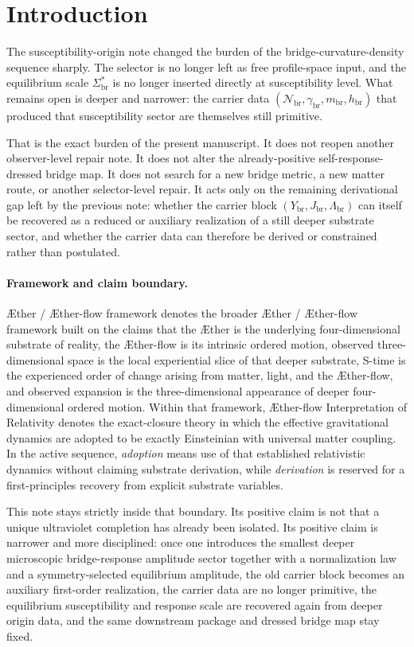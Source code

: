 \documentclass[11pt]{article}
\newcommand{\Aether}{\AE{}ther}
\newcommand{\Aflow}{\AE{}ther-flow}
\newcommand{\TheoryName}{\Aflow{} Interpretation of Relativity}
\newcommand{\TheoryProgram}{\Aether{} / \Aflow{} framework}
\newcommand{\RespSusEq}{\Sigma_{\mathrm{br}}^{\ast}}
\newcommand{\RespCarrier}{Y_{\mathrm{br}}}
\newcommand{\RespFlux}{J_{\mathrm{br}}}
\newcommand{\RespCompat}{\Lambda_{\mathrm{br}}}
\newcommand{\RespNorm}{\mathcal N_{\mathrm{br}}}
\newcommand{\RespFluxCoeff}{\gamma_{\mathrm{br}}}
\newcommand{\RespGap}{m_{\mathrm{br}}}
\newcommand{\RespBias}{h_{\mathrm{br}}}
\begin{document}
\section{Introduction}

The susceptibility-origin note changed the burden of the bridge-curvature-density sequence sharply. The selector is no longer left as free profile-space input, and the equilibrium scale \(\RespSusEq\) is no longer inserted directly at susceptibility level. What remains open is deeper and narrower: the carrier data \((\RespNorm,\RespFluxCoeff,\RespGap,\RespBias)\) that produced that susceptibility sector are themselves still primitive.

That is the exact burden of the present manuscript. It does not reopen another observer-level repair note. It does not alter the already-positive self-response-dressed bridge map. It does not search for a new bridge metric, a new matter route, or another selector-level repair. It acts only on the remaining derivational gap left by the previous note: whether the carrier block \((\RespCarrier,\RespFlux,\RespCompat)\) can itself be recovered as a reduced or auxiliary realization of a still deeper substrate sector, and whether the carrier data can therefore be derived or constrained rather than postulated.

\paragraph{Framework and claim boundary.}
\TheoryProgram{} denotes the broader \Aether{} / \Aflow{} framework built on the claims that the \Aether{} is the underlying four-dimensional substrate of reality, the \Aflow{} is its intrinsic ordered motion, observed three-dimensional space is the local experiential slice of that deeper substrate, S-time is the experienced order of change arising from matter, light, and the \Aflow{}, and observed expansion is the three-dimensional appearance of deeper four-dimensional ordered motion. Within that framework, \TheoryName{} denotes the exact-closure theory in which the effective gravitational dynamics are adopted to be exactly Einsteinian with universal matter coupling. In the active sequence, \emph{adoption} means use of that established relativistic dynamics without claiming substrate derivation, while \emph{derivation} is reserved for a first-principles recovery from explicit substrate variables.

This note stays strictly inside that boundary. Its positive claim is not that a unique ultraviolet completion has already been isolated. Its positive claim is narrower and more disciplined: once one introduces the smallest deeper microscopic bridge-response amplitude sector together with a normalization law and a symmetry-selected equilibrium amplitude, the old carrier block becomes an auxiliary first-order realization, the carrier data are no longer primitive, the equilibrium susceptibility and response scale are recovered again from deeper origin data, and the same downstream package and dressed bridge map stay fixed.
\end{document}

